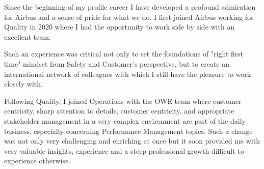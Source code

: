 \documentclass[11pt,a4paper]{letter}
\begin{document}
{\setlength{\parindent}{5mm}

Since the beginning of my profile career I have developed a profound admiration for Airbus and a sense of pride for what we do. I first joined Airbus working for Quality in 2020 where I had the opportunity to work side by side with an excellent team. 

Such an experience was critical not only to set the foundations of "right first time" mindset from Safety and Customer's perspective, but to create an international network of colleagues with which I still have the pleasure to work closely with.

 
Following Quality, I joined Operations with the OWE team where customer centricity, sharp attention to details, customer centricity, and appropriate stakeholder management in a very complex environment are part of the daily business, especially concerning Performance Management topics. Such a change was not only very challenging and enriching at once but it soon provided me with very valuable insights, experience and a steep professional growth difficult to experience otherwise.

}
\end{document}
